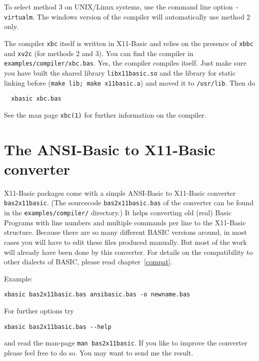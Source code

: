 To select method 3 on UNIX/Linux systems, use the command line option 
\verb|-virtualm|. The windows version of the compiler will automatically use
method 2 only.

The compiler \verb|xbc| itself is written in X11-Basic and relies on the
presence of \verb|xbbc| and \verb|xv2c| (for methods 2 and 3).
You can find the compiler in \verb|examples/compiler/xbc.bas|. 
Yes, the compiler compiles itself. Just make sure you have built the shared 
library \verb|libx11basic.so| and the library for static linking before  
(\verb|make lib; make x11basic.a|) and moved it to \verb|/usr/lib|. Then do
\begin{mdframed}[hidealllines=true,backgroundcolor=black!20]
\begin{verbatim}
  xbasic xbc.bas
\end{verbatim}
\end{mdframed}
See the man page \verb|xbc(1)| for further information on the compiler.




\section{The ANSI-Basic to X11-Basic converter}

X11-Basic packages come with a simple ANSI-Basic to X11-Basic converter 
\verb|bas2x11basic|. (The sourcecode \verb|bas2x11basic.bas| of the converter can
be found in the \verb|examples/compiler/| directory.)
It helps converting old (real) Basic Programs with line numbers and multiple
commands per line to the X11-Basic structure.  Because there are so many
different BASIC versions around, in most cases you will have to edit these
files produced manually. But most of the work will already  have been done by
this converter. For details on the compatibility to other dialects of BASIC, 
please read chapter~\ref{compat}.

Example:
\begin{mdframed}[hidealllines=true,backgroundcolor=black!20]
\begin{verbatim}
xbasic bas2x11basic.bas ansibasic.bas -o newname.bas
\end{verbatim}
\end{mdframed}

For further options try 
\begin{mdframed}[hidealllines=true,backgroundcolor=black!20]
\begin{verbatim}
xbasic bas2x11basic.bas --help
\end{verbatim}
\end{mdframed}
and read the man-page \verb|man bas2x11basic|. If you like to improve 
the converter please feel free to do so. You may want to send me the result.



